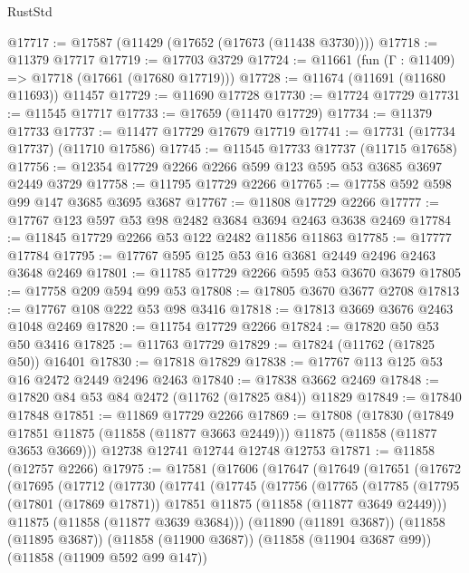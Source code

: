 \begin{lexlean}{RustStd}
\begin{coremodule}
@17717 := @17587 (@11429 (@17652 (@17673 (@11438 @3730))))
@17718 := @11379 @17717
@17719 := @17703 @3729
@17724 := @11661 (fun (Γ : @11409) => @17718 (@17661 (@17680 @17719)))
@17728 := @11674 (@11691 (@11680 @11693)) @11457
@17729 := @11690 @17728
@17730 := @17724 @17729
@17731 := @11545 @17717
@17733 := @17659 (@11470 @17729)
@17734 := @11379 @17733
@17737 := @11477 @17729 @17679 @17719
@17741 := @17731 (@17734 @17737) (@11710 @17586)
@17745 := @11545 @17733 @17737 (@11715 @17658)
@17756 := @12354 @17729 @2266 @2266 @599 @123 @595 @53 @3685 @3697 @2449 @3729
@17758 := @11795 @17729 @2266
@17765 := @17758 @592 @598 @99 @147 @3685 @3695 @3687
@17767 := @11808 @17729 @2266
@17777 := @17767 @123 @597 @53 @98 @2482 @3684 @3694 @2463 @3638 @2469
@17784 := @11845 @17729 @2266 @53 @122 @2482 @11856 @11863
@17785 := @17777 @17784
@17795 := @17767 @595 @125 @53 @16 @3681 @2449 @2496 @2463 @3648 @2469
@17801 := @11785 @17729 @2266 @595 @53 @3670 @3679
@17805 := @17758 @209 @594 @99 @53
@17808 := @17805 @3670 @3677 @2708
@17813 := @17767 @108 @222 @53 @98 @3416
@17818 := @17813 @3669 @3676 @2463 @1048 @2469
@17820 := @11754 @17729 @2266
@17824 := @17820 @50 @53 @50 @3416
@17825 := @11763 @17729
@17829 := @17824 (@11762 (@17825 @50)) @16401
@17830 := @17818 @17829
@17838 := @17767 @113 @125 @53 @16 @2472 @2449 @2496 @2463
@17840 := @17838 @3662 @2469
@17848 := @17820 @84 @53 @84 @2472 (@11762 (@17825 @84)) @11829
@17849 := @17840 @17848
@17851 := @11869 @17729 @2266
@17869 := @17808
    (@17830
      (@17849 @17851 @11875 (@11858 (@11877 @3663 @2449)))
      @11875
      (@11858 (@11877 @3653 @3669)))
    @12738
    @12741
    @12744
    @12748
    @12753
@17871 := @11858 (@12757 @2266)
@17975 := @17581
    (@17606
      (@17647
        (@17649
          (@17651
            (@17672
              (@17695
                (@17712
                  (@17730
                    (@17741
                      (@17745
                        (@17756
                          (@17765
                            (@17785
                              (@17795
                                (@17801 (@17869 @17871))
                                @17851
                                @11875
                                (@11858 (@11877 @3649 @2449)))
                              @11875
                              (@11858 (@11877 @3639 @3684)))
                            (@11890 (@11891 @3687))
                            (@11858 (@11895 @3687))
                            (@11858 (@11900 @3687))
                            (@11858 (@11904 @3687 @99))
                            (@11858 (@11909 @592 @99 @147))

\end{coremodule}
\end{lexlean}
